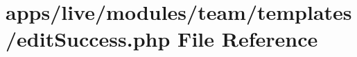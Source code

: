 \hypertarget{live_2modules_2team_2templates_2edit_success_8php}{\section{apps/live/modules/team/templates/edit\-Success.php File Reference}
\label{live_2modules_2team_2templates_2edit_success_8php}
}
